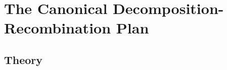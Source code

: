 \section{The Canonical Decomposition-Recombination Plan}
\label{sec:DRP}

\subsection{Theory}









